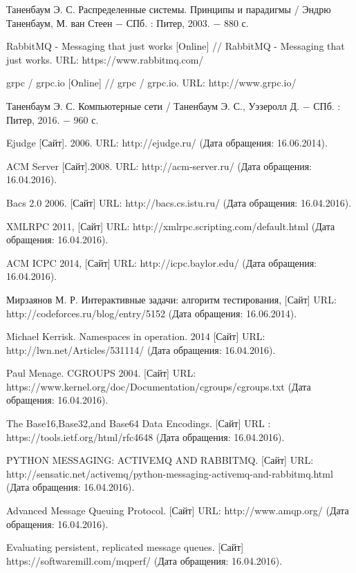 \begin{thebibliography}{9}

Таненбаум Э. С. Распределенные системы. Принципы и парадигмы / Эндрю Таненбаум, М. ван Стеен − СПб. : Питер, 2003. − 880 с.

RabbitMQ - Messaging that just works [Online] // RabbitMQ - Messaging that just works. URL: https://www.rabbitmq.com/

grpc / grpc.io [Online] // grpc / grpc.io. URL: http://www.grpc.io/

Таненбаум Э. С. Компьютерные сети / Таненбаум Э. С., Уэзеролл Д. − СПб. : Питер, 2016. − 960 с.

Ejudge [Сайт]. 2006. URL: http://ejudge.ru/ (Дата обращения: 16.06.2014).

ACM Server [Сайт].2008. URL: http://acm-server.ru/ (Дата обращения: 16.04.2016).

Bacs 2.0 2006. [Сайт] URL: http://bacs.cs.istu.ru/ (Дата обращения: 16.04.2016).

XMLRPC 2011, [Сайт] URL: http://xmlrpc.scripting.com/default.html (Дата обращения: 16.04.2016).

ACM ICPC 2014, [Сайт] URL: http://icpc.baylor.edu/ (Дата обращения: 16.04.2016).

Мирзаянов М. Р. Интерактивные задачи: алгоритм тестирования, [Сайт] URL: http://codeforces.ru/blog/entry/5152 (Дата обращения: 16.06.2014).

Michael Kerrisk. Namespaces in operation. 2014 [Сайт] URL: http://lwn.net/Articles/531114/ (Дата обращения: 16.04.2016).

Paul Menage. CGROUPS 2004. [Сайт] URL: https://www.kernel.org/doc/Documentation/cgroups/cgroups.txt (Дата обращения: 16.04.2016).

The Base16,Base32,and Base64 Data Encodings. [Сайт] URL : https://tools.ietf.org/html/rfc4648 (Дата обращения: 16.04.2016).

PYTHON MESSAGING: ACTIVEMQ AND RABBITMQ. [Сайт] URL: http://sensatic.net/activemq/python-messaging-activemq-and-rabbitmq.html (Дата обращения: 16.04.2016).

Advanced Message Queuing Protocol. [Сайт] URL: http://www.amqp.org/ (Дата обращения: 16.04.2016).

Evaluating persistent, replicated message queues. [Сайт] https://softwaremill.com/mqperf/ (Дата обращения: 16.04.2016).

\end{thebibliography}
